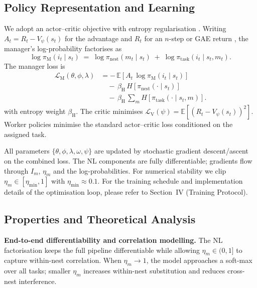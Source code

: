 \documentclass[journal,onecolumn]{IEEEtran}
\begin{document}
\subsection{Policy Representation and Learning}
We adopt an actor–critic objective with entropy regularisation \citep{suttonbarto2018}. Writing \(A_t = R_t - V_\psi(s_t)\) for the advantage and \(R_t\) for an \(n\)-step or GAE return \citep{schulman2016gae}, the manager’s log-probability factorises as
\[ \log \pi_{\mathrm{M}}(i_t\mid s_t)\;=\; \log \pi_{\mathrm{nest}}(m_t\mid s_t)\; +\; \log \pi_{\mathrm{task}}(i_t\mid s_t,m_t). \]
The manager loss is
\begin{equation}
\begin{aligned}
\mathcal{L}_{\mathrm{M}}(\theta,\phi,\lambda)
&= -\,\mathbb{E}\!\left[ A_t\, \log \pi_{\mathrm{M}}(i_t\mid s_t) \right] \\
&\quad -\, \beta_{\mathrm{H}}\, H\!\left[\pi_{\mathrm{nest}}(\cdot\mid s_t)\right] \\
&\quad -\, \beta_{\mathrm{H}}\, \sum_m H\!\left[\pi_{\mathrm{task}}(\cdot\mid s_t,m)\right].
\end{aligned}
\end{equation}
with entropy weight \(\beta_{\mathrm{H}}\). The critic minimises \(\mathcal{L}_{\mathrm{V}}(\psi) = \mathbb{E}[ (R_t - V_\psi(s_t))^2 ]\). Worker policies minimise the standard actor–critic loss conditioned on the assigned task.

All parameters \(\{\theta,\phi,\lambda,\omega,\psi\}\) are updated by stochastic gradient descent/ascent on the combined loss. The NL components are fully differentiable; gradients flow through \(I_m\), \(\eta_m\) and the log-probabilities. For numerical stability we clip \(\eta_m\in[\eta_{\min},1]\) with \(\eta_{\min}\approx 0.1\).
For the training schedule and implementation details of the optimisation loop, please refer to Section~IV (Training Protocol).


\subsection{Properties and Theoretical Analysis}
\textbf{End-to-end differentiability and correlation modelling.} The NL factorisation keeps the full pipeline differentiable while allowing \(\eta_m\in(0,1]\) to capture within-nest correlation. When \(\eta_m\to 1\), the model approaches a soft-max over all tasks; smaller \(\eta_m\) increases within-nest substitution and reduces cross-nest interference.
\end{document}
